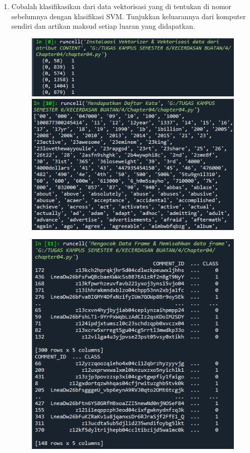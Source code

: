 \begin{enumerate}
	\item Cobalah klasifikasikan dari data vektorisasi yang di tentukan di nomor sebelumnya dengan klasifikasi SVM. Tunjukkan keluarannya dari komputer sendiri dan artikan maksud setiap luaran yang didapatkan.
	      \begin{figure}[ht]
		      \centerline{\includegraphics[scale=0.7]{figures/chappter4-4.png}}
		      \centerline{\includegraphics[scale=0.7]{figures/chappter4-4a.png}}
	      \end{figure}
	      \newpage
	      \begin{figure}[ht]
		      \centerline{\includegraphics[scale=0.7]{figures/chappter4-4b.png}}

\end{figure}
\end{enumerate}
